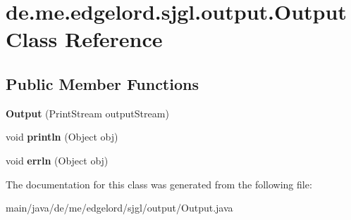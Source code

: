 \hypertarget{classde_1_1me_1_1edgelord_1_1sjgl_1_1output_1_1_output}{}\section{de.\+me.\+edgelord.\+sjgl.\+output.\+Output Class Reference}
\label{classde_1_1me_1_1edgelord_1_1sjgl_1_1output_1_1_output}
\subsection*{Public Member Functions}
\begin{DoxyCompactItemize}
\item 
\mbox{\label{classde_1_1me_1_1edgelord_1_1sjgl_1_1output_1_1_output_a281cac66a634e2ab953ea3adfcd9970a}} 
{\bfseries Output} (Print\+Stream output\+Stream)
\item 
\mbox{\label{classde_1_1me_1_1edgelord_1_1sjgl_1_1output_1_1_output_a477d0c0fddaf37f9149d12df446b68e6}} 
void {\bfseries println} (Object obj)
\item 
\mbox{\label{classde_1_1me_1_1edgelord_1_1sjgl_1_1output_1_1_output_abec06475a6ddceb9e16d343006a56f52}} 
void {\bfseries errln} (Object obj)
\end{DoxyCompactItemize}


The documentation for this class was generated from the following file\+:\begin{DoxyCompactItemize}
\item 
main/java/de/me/edgelord/sjgl/output/Output.\+java\end{DoxyCompactItemize}

